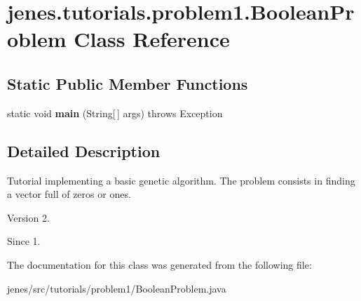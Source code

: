 \hypertarget{classjenes_1_1tutorials_1_1problem1_1_1_boolean_problem}{\section{jenes.\-tutorials.\-problem1.\-Boolean\-Problem Class Reference}
\label{classjenes_1_1tutorials_1_1problem1_1_1_boolean_problem}
}
\subsection*{Static Public Member Functions}
\begin{DoxyCompactItemize}
\item 
\hypertarget{classjenes_1_1tutorials_1_1problem1_1_1_boolean_problem_a04df83435bdce30ece47f2407f186d14}{static void {\bfseries main} (String\mbox{[}$\,$\mbox{]} args)  throws Exception }\label{classjenes_1_1tutorials_1_1problem1_1_1_boolean_problem_a04df83435bdce30ece47f2407f186d14}

\end{DoxyCompactItemize}


\subsection{Detailed Description}
Tutorial implementing a basic genetic algorithm. The problem consists in finding a vector full of zeros or ones.

\begin{DoxyVersion}{Version}
2. 
\end{DoxyVersion}
\begin{DoxySince}{Since}
1. 
\end{DoxySince}


The documentation for this class was generated from the following file\-:\begin{DoxyCompactItemize}
\item 
jenes/src/tutorials/problem1/Boolean\-Problem.\-java\end{DoxyCompactItemize}
